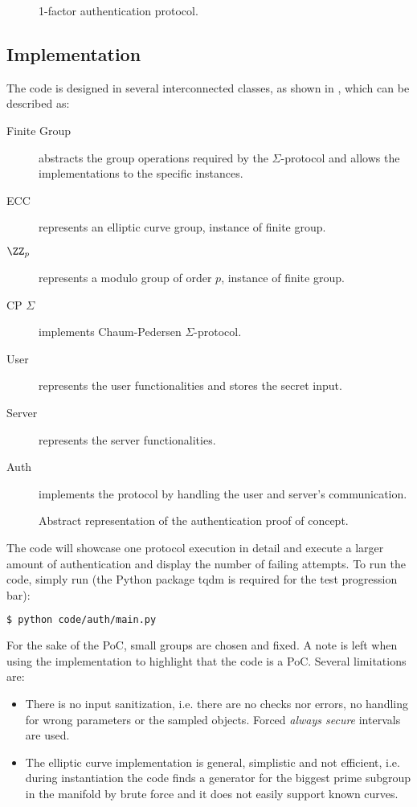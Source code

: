 \documentclass[a4paper,10pt]{article}
\begin{document}
\begin{figure}[!ht]
  \centering
  
  \caption{1-factor authentication protocol.}\label{fig:auth}
\end{figure}



\subsection{Implementation}

The code is designed in several interconnected classes, as shown in , which can be
described as:
\begin{description}
  \item[Finite Group] abstracts the group operations required by the $\Sigma$-protocol
    and allows the implementations to the specific instances.
  \item[ECC] represents an elliptic curve group, instance of finite group.
  \item[$\ZZ_p$] represents a modulo group of order $p$, instance of finite group.
  \item[CP $\Sigma$] implements Chaum-Pedersen $\Sigma$-protocol.
  \item[User] represents the user functionalities and stores the secret input.
  \item[Server] represents the server functionalities.
  \item[Auth] implements the protocol by handling the user and server's communication.
\end{description}


\begin{figure}[!ht]
  \centering
  
  \caption{Abstract representation of the authentication proof of concept.}\label{fig:authcode}
\end{figure}

The code will showcase one protocol execution in detail and execute a larger amount of
authentication and display the number of failing attempts.
%
To run the code, simply run (the Python package \textsf{tqdm} is required for the test
  progression bar):
\begin{lstlisting}[language=bash]
  $ python code/auth/main.py
\end{lstlisting}

For the sake of the PoC, small groups are chosen and fixed.
A note is left when using the implementation to highlight that the code is a PoC.
Several limitations are:
\begin{itemize}
  \item There is no input sanitization, i.e. there are no checks nor errors, no handling
    for wrong parameters or the sampled objects.
    Forced \emph{always secure} intervals are used.
  \item The elliptic curve implementation is general, simplistic and not efficient, i.e. during
    instantiation the code finds a generator for the biggest prime subgroup in the manifold by
    brute force and it does not easily support known curves.
    
\end{itemize}
\end{document}
